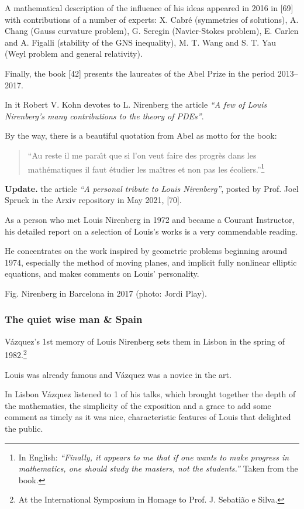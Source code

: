 \documentclass{article}
\begin{document}
A mathematical description of the influence of his ideas appeared in 2016 in [69] with contributions of a number of experts: X. Cabr\'e (symmetries of solutions), A. Chang (Gauss curvature problem), G. Seregin (Navier-Stokes problem), E. Carlen and A. Figalli (stability of the GNS inequality), M. T. Wang and S. T. Yau (Weyl problem and general relativity).

Finally, the book [42] presents the laureates of the Abel Prize in the period 2013--2017.

In it Robert V. Kohn devotes to L. Nirenberg the article \textit{``A few of Louis Nirenberg's many contributions to the theory of PDEs''}.

By the way, there is a beautiful quotation from Abel as motto for the book:
\begin{quotation}
	``Au reste il me para\^{\i}t que si l'on veut faire des progr\`es dans les math\'ematiques il faut \'etudier les maîtres et non pas les \'ecoliers.''\footnote{In English: \textit{``Finally, it appears to me that if one wants to make progress in mathematics, one should study the masters, not the students.''} Taken from the book.}
\end{quotation}
\textbf{Update.} the article \textit{``A personal tribute to Louis Nirenberg''}, posted by Prof. Joel Spruck in the Arxiv repository in May 2021, [70].

As a person who met Louis Nirenberg in 1972 and became a Courant Instructor, his detailed report on a selection of Louis's works is a very commendable reading.

He concentrates on the work inspired by geometric problems beginning around 1974, especially the method of moving planes, and implicit fully nonlinear elliptic equations, and makes comments on Louis' personality.

\textsf{Fig. Nirenberg in Barcelona in 2017 (photo: Jordi Play).}

\subsubsection{The quiet wise man \& Spain}
V\'azquez's 1st memory of Louis Nirenberg sets them in Lisbon in the spring of 1982.\footnote{At the International Symposium in Homage to Prof. J. Sebati\~ao e Silva.}

Louis was already famous and V\'azquez was a novice in the art.

In Lisbon V\'azquez listened to 1 of his talks, which brought together the depth of the mathematics, the simplicity of the exposition and a grace to add some comment as timely as it was nice, characteristic features of Louis that delighted the public.
\end{document}
